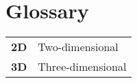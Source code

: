 \chapter*{Glossary}

\begin{table}[!hb]
    \begin{tabular}{ll}
        \textbf{2D} & Two-dimensional   \\
        \textbf{3D} & Three-dimensional \\
    \end{tabular}
\end{table}
